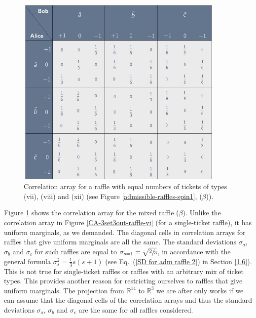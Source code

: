 \begin{figure}[ht]
 \centering
   \includegraphics[width=4in]{CA-3set3out-raffle-33vi33viii33xii.jpeg} 
   \caption{Correlation array for a raffle with equal numbers of tickets of types (vii), (viii) and (xii) (see Figure \ref{admissible-raffles-spin1}, ($\beta$)).}
   \label{CA-3set3out-raffle-33vi33viii33xii}
\end{figure}

Figure \ref{CA-3set3out-raffle-33vi33viii33xii} shows the correlation array for the mixed raffle ($\beta$). Unlike the correlation array in Figure \ref{CA-3set3out-raffle-vi} (for a single-ticket raffle), it has uniform marginals, as we demanded. The diagonal cells in correlation arrays for raffles that give uniform marginals are all the same. The standard deviations $\sigma_a$, $\sigma_b$ and $\sigma_c$ for such raffles are equal to $\sigma_{s=1} = \sqrt{\sfrac23}$, in accordance with the general formula $\sigma_s^2 = \frac13 s(s+1)$ (see Eq.\ (\ref{SD for adm raffle 2}) in Section \ref{1.6}). This is not true for single-ticket raffles or raffles with an arbitrary mix of ticket types. This provides another reason for restricting ourselves to raffles that give uniform marginals. The projection from $\mathbb{R}^{14}$ to $\mathbb{R}^3$ we are after only works if we can assume that the diagonal cells of the correlation arrays and thus the standard deviations $\sigma_a$, $\sigma_b$ and $\sigma_c$ are the same for all raffles considered.

